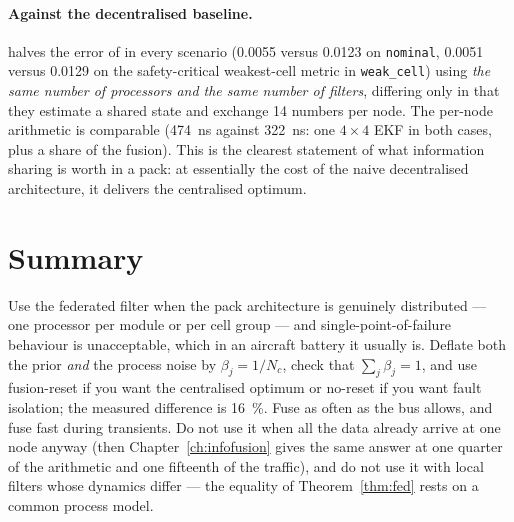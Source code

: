 \paragraph{Against the decentralised baseline.}  halves the error of
 in every scenario (\num{0.0055} versus \num{0.0123} on
\texttt{nominal}, \num{0.0051} versus \num{0.0129} on the safety-critical weakest-cell metric in
\texttt{weak\_cell}) using \emph{the same number of processors and the same number of filters},
differing only in that they estimate a shared state and exchange 14 numbers per node. The
per-node arithmetic is comparable (\SI{474}{\nano\second} against \SI{322}{\nano\second}: one
$4\times4$ EKF in both cases, plus a share of the fusion). This is the clearest statement of what
information sharing is worth in a pack: at essentially the cost of the naive decentralised
architecture, it delivers the centralised optimum.

\section{Summary}
Use the federated filter when the pack architecture is genuinely distributed --- one processor per
module or per cell group --- and single-point-of-failure behaviour is unacceptable, which in an
aircraft battery it usually is. Deflate both the prior \emph{and} the process noise by
$\beta_j=1/N_c$, check that $\sum_j\beta_j=1$, and use fusion-reset if you want the centralised
optimum or no-reset if you want fault isolation; the measured difference is \SI{16}{\percent}.
Fuse as often as the bus allows, and fuse fast during transients. Do not use it when all the data
already arrive at one node anyway (then Chapter~\ref{ch:infofusion} gives the same answer at one
quarter of the arithmetic and one fifteenth of the traffic), and do not use it with local filters
whose dynamics differ --- the equality of Theorem~\ref{thm:fed} rests on a common process model.
